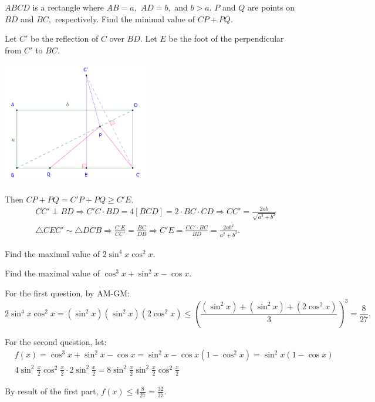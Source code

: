 \documentclass{article}
\begin{document}
\newpage

\begin{problem}
    $ABCD$ is a rectangle where $AB=a,$ $AD=b,$ and $b>a.$ $P$ and $Q$ are points on $BD$ and $BC,$ respectively.
    Find the minimal value of $CP + PQ.$
\end{problem}

\begin{soln}
    Let $C'$ be the reflection of $C$ over $BD.$ Let $E$ be the foot of the perpendicular from $C'$ to $BC.$
    \begin{center}
        \includegraphics[width=6.5cm]{./svg/pdf/23-24-sm2-s4-ct-p3-7-2.pdf}
    \end{center}
    
    Then $CP + PQ = C'P + PQ \ge C'E.$
    \[
        \begin{aligned}
            &CC' \perp BD \Rightarrow C'C \cdot BD = 4[BCD] = 2\cdot BC \cdot CD \Rightarrow CC' = \frac{2ab}{\sqrt{a^2+b^2}}\\
            &\triangle CEC' \sim \triangle DCB \Rightarrow \frac{C'E}{CC'} = \frac{BC}{DB} \Rightarrow C'E = \frac{CC' \cdot BC}{BD} = \boxed{\frac{2ab^2}{a^2+b^2}.}
        \end{aligned}
    \] 
\end{soln}

\begin{problem}
    Find the maximal value of $2\sin^4{x}\cos^2{x}.$

    Find the maximal value of $\cos^3{x} + \sin^2{x} - \cos{x}.$
\end{problem}

\begin{soln}
    For the first question, by AM-GM:
    \[
        2\sin^4{x}\cos^2{x} = (\sin^2{x})(\sin^2{x})(2\cos^2{x}) \le \left( \frac{(\sin^2{x})+ (\sin^2{x}) + (2\cos^2{x}) }{3}\right)^3 = \boxed{\frac{8}{27}.}
    \]

    For the second question, let:
    \[
        \begin{aligned}
            &f(x) = \cos^3{x} + \sin^2{x} - \cos{x} = \sin^2{x} - \cos{x}(1-\cos^2{x}) = \sin^2{x}(1-\cos{x})\\
            &4 \sin^2{\frac{x}{2}}\cos^2{\frac{x}{2}} \cdot 2\sin^2{\frac{x}{2}} = 8 \sin^2{\frac{x}{2}}\sin^2{\frac{x}{2}}\cos^2{\frac{x}{2}}
        \end{aligned}
    \]

    By result of the first part, $f(x) \le 4 \frac{8}{27} = \boxed{\frac{32}{27}.}$
\end{soln}
\end{document}

